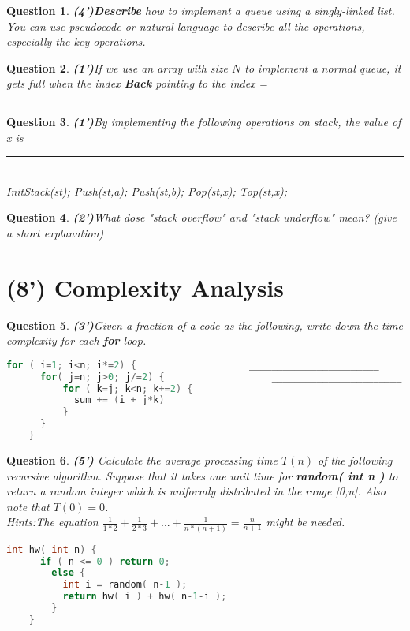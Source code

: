 \documentclass[11pt]{article}
\newtheorem{Q}{Question}
\begin{document}
\begin{Q}
\textbf{(4')}\textbf{Describe} how to implement a queue using a singly-linked list. You can use pseudocode or natural language to describe all the operations, especially the key operations.
\end{Q}
\vspace{2.5in}
\begin{Q}
\textbf{(1')}If we use an array with size $N$ to implement a normal queue, it gets full when the index \textbf{Back} pointing to the index = \rule[-10pt]{2cm}{0.05em}
\vspace{0.1in}
\end{Q}

\begin{Q}
\textbf{(1')}By implementing the following  operations on stack, the value of x is \rule[-10pt]{2cm}{0.05em}\\
InitStack(st); Push(st,a); Push(st,b); Pop(st,x); Top(st,x);
\vspace{0.1in}
\end{Q}

\begin{Q}
\textbf{(2')}What dose "stack overflow" and "stack underflow" mean? (give a short explanation)
\vspace{1.5in}
\end{Q}



\section{(8') Complexity Analysis}
\begin{Q}
\textbf{(3')}Given a fraction of a code as the following, write down the time complexity for each \textbf{for} loop. 

\begin{lstlisting}[language=C++]
	for ( i=1; i<n; i*=2) {                    _______________________ 
	  for( j=n; j>0; j/=2) {                   _______________________ 
		  for ( k=j; k<n; k+=2) {          _______________________ 
			sum += (i + j*k)
		  }
	  }
	}
\end{lstlisting}
\end{Q}


\begin{Q}
\textbf{(5')}	Calculate the average processing time $T(n)$ of the following recursive algorithm. Suppose that it takes one unit time for \textbf{random( int n )} to return a random integer which is uniformly distributed in the range [0,n]. Also note that $T(0)=0$. \\
	\textit{Hints}:The equation $\frac{1}{1*2}+\frac{1}{2*3}+...+\frac{1}{n*(n+1)}=\frac{n}{n+1}$ might be needed.
	
	\begin{lstlisting}[language=C++]
	int hw( int n) {
	  if ( n <= 0 ) return 0;
	    else {
		  int i = random( n-1 );
		  return hw( i ) + hw( n-1-i );
		}
	}
	\end{lstlisting}
\end{Q}
\end{document}
